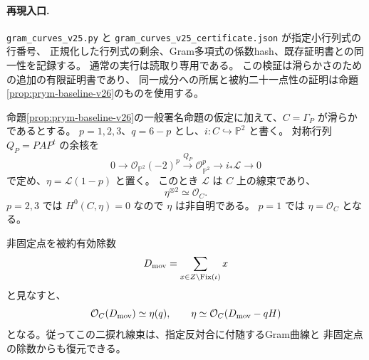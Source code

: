 \paragraph{再現入口.}
\nolinkurl{gram_curves_v25.py} と
\nolinkurl{gram_curves_v25_certificate.json} が指定小行列式の行番号、
正規化した行列式の剰余、Gram多項式の係数hash、既存証明書との同一性を記録する。
通常の実行は読取り専用である。
この検証は滑らかさのための追加の有限証明書であり、
同一成分への所属と被約二十一点性の証明は命題\ref{prop:prym-baseline-v26}のものを使用する。

\begin{proposition}[非自明二捩れ線束と非固定点の除数]
\label{prop:gram-prym-divisor-v25}
命題\ref{prop:prym-baseline-v26}の一般署名命題の仮定に加えて、$C=\Gamma_P$ が滑らかであるとする。
$p=1,2,3$、$q=6-p$ とし、$i:C\hookrightarrow\mathbb P^2$ と書く。
対称行列 $Q_P=PAP^t$ の余核を
\begin{equation}\label{eq:gram-line-resolution-v25}
 0\longrightarrow\mathcal O_{\mathbb P^2}(-2)^p
 \xrightarrow{Q_P}\mathcal O_{\mathbb P^2}^{p}
 \longrightarrow i_*\mathcal L\longrightarrow0
\end{equation}
で定め、$\eta=\mathcal L(1-p)$ と置く。
このとき $\mathcal L$ は $C$ 上の線束であり、
\[
 \eta^{\otimes2}\simeq\mathcal O_C.
\]
$p=2,3$ では $H^0(C,\eta)=0$ なので $\eta$ は非自明である。
$p=1$ では $\eta=\mathcal O_C$ となる。

非固定点を被約有効除数
\[
 D_{\rm mov}=\sum_{x\in Z\setminus\operatorname{Fix}(\iota)}x
\]
と見なすと、
\begin{equation}\label{eq:moving-prym-divisor-v25}
 \mathcal O_C(D_{\rm mov})\simeq\eta(q),
 \qquad
 \eta\simeq\mathcal O_C(D_{\rm mov}-qH)
\end{equation}
となる。従ってこの二捩れ線束は、指定反対合に付随するGram曲線と
非固定点の除数からも復元できる。
\end{proposition}

